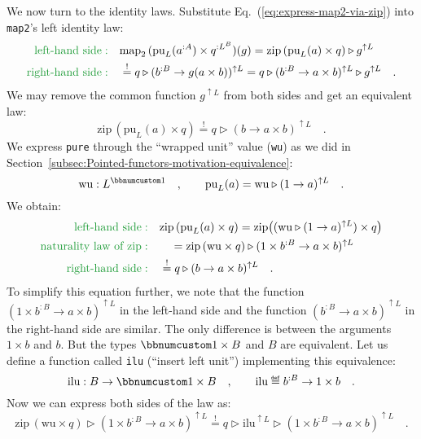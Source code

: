 We now turn to the identity laws. Substitute Eq.~(\ref{eq:express-map2-via-zip})
into \lstinline!map2!\textsf{'}s left identity law:
\begin{align*}
{\color{greenunder}\text{left-hand side}:}\quad & \text{map}_{2}\,(\text{pu}_{L}(a^{:A})\times q^{:L^{B}})(g)=\text{zip}\,(\text{pu}_{L}(a)\times q)\triangleright g^{\uparrow L}\\
{\color{greenunder}\text{right-hand side}:}\quad & \overset{!}{=}q\triangleright(b^{:B}\rightarrow g(a\times b))^{\uparrow L}=q\triangleright(b^{:B}\rightarrow a\times b)^{\uparrow L}\triangleright g^{\uparrow L}\quad.
\end{align*}
We may remove the common function $g^{\uparrow L}$ from both sides
and get an equivalent law:
\[
\text{zip}\,(\text{pu}_{L}(a)\times q)\overset{!}{=}q\triangleright(b\rightarrow a\times b)^{\uparrow L}\quad.
\]
We express \lstinline!pure! through the \textsf{``}wrapped unit\textsf{''} value
(\lstinline!wu!) as we did in Section~\ref{subsec:Pointed-functors-motivation-equivalence}:
\[
\text{wu}:L^{\bbnum 1}\quad,\quad\quad\text{pu}_{L}(a)=\text{wu}\triangleright(1\rightarrow a)^{\uparrow L}\quad.
\]
We obtain:
\begin{align*}
{\color{greenunder}\text{left-hand side}:}\quad & \text{zip}\,(\text{pu}_{L}(a)\times q)=\text{zip}\big((\text{wu}\triangleright(1\rightarrow a)^{\uparrow L})\times q\big)\\
{\color{greenunder}\text{naturality law of }\text{zip}:}\quad & \quad=\text{zip}\,(\text{wu}\times q)\triangleright(1\times b^{:B}\rightarrow a\times b)^{\uparrow L}\\
{\color{greenunder}\text{right-hand side}:}\quad & \overset{!}{=}q\triangleright(b\rightarrow a\times b)^{\uparrow L}\quad.
\end{align*}
To simplify this equation further, we note that the function $(1\times b^{:B}\rightarrow a\times b)^{\uparrow L}$
in the left-hand side and the function $(b^{:B}\rightarrow a\times b)^{\uparrow L}$
in the right-hand side are similar. The only difference is between
the arguments $1\times b$ and $b$. But the types $\bbnum 1\times B$
and $B$ are equivalent. Let us define a function called \lstinline!ilu!
(\textsf{``}insert left unit\textsf{''}) implementing this equivalence:
\[
\text{ilu}:B\rightarrow\bbnum 1\times B\quad,\quad\quad\text{ilu}\triangleq b^{:B}\rightarrow1\times b\quad.
\]
Now we can express both sides of the law as:
\begin{equation}
\text{zip}\,(\text{wu}\times q)\triangleright(1\times b^{:B}\rightarrow a\times b)^{\uparrow L}\overset{!}{=}q\triangleright\text{ilu}^{\uparrow L}\triangleright(1\times b^{:B}\rightarrow a\times b)^{\uparrow L}\quad.\label{eq:left-identity-zip-derivation1}
\end{equation}
